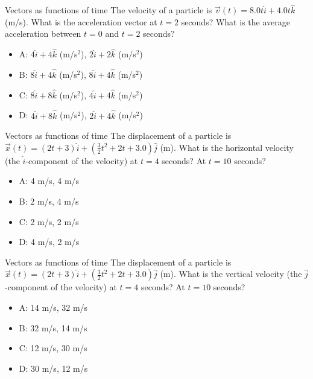\documentclass{beamer}
\begin{document}
\begin{frame}{Vectors as functions of time}
The velocity of a particle is $\vec{v}(t) = 8.0t\hat{i} + 4.0t\hat{k}$ (m/s).  What is the acceleration vector at $t=2$ seconds?  What is the average acceleration between $t=0$ and $t=2$ seconds?
\begin{itemize}
\item A: $4\hat{i} + 4\hat{k}$ (m/s$^2$), $2\hat{i} + 2\hat{k}$ (m/s$^2$)
\item B: $8\hat{i} + 4\hat{k}$ (m/s$^2$), $8\hat{i} + 4\hat{k}$ (m/s$^2$)
\item C: $8\hat{i} + 8\hat{k}$ (m/s$^2$), $4\hat{i} + 4\hat{k}$ (m/s$^2$)
\item D: $4\hat{i} + 8\hat{k}$ (m/s$^2$), $2\hat{i} + 4\hat{k}$ (m/s$^2$)
\end{itemize}
\end{frame}

\begin{frame}{Vectors as functions of time}
\small
The displacement of a particle is $\vec{x}(t) = (2t+3)\hat{i}+(\frac{3}{2}t^2+2t+3.0)\hat{j}$ (m).  What is the horizontal velocity (the $\hat{i}$-component of the velocity) at $t=4$ seconds?  At $t=10$ seconds?
\begin{itemize}
\item A: 4 m/s, 4 m/s
\item B: 2 m/s, 4 m/s
\item C: 2 m/s, 2 m/s
\item D: 4 m/s, 2 m/s
\end{itemize}
\end{frame}

\begin{frame}{Vectors as functions of time}
\small
The displacement of a particle is $\vec{x}(t) = (2t+3)\hat{i}+(\frac{3}{2}t^2+2t+3.0)\hat{j}$ (m).  What is the vertical velocity (the $\hat{j}$-component of the velocity) at $t=4$ seconds?  At $t=10$ seconds?
\begin{itemize}
\item A: 14 m/s, 32 m/s
\item B: 32 m/s, 14 m/s
\item C: 12 m/s, 30 m/s
\item D: 30 m/s, 12 m/s
\end{itemize}
\end{frame}
\end{document}
